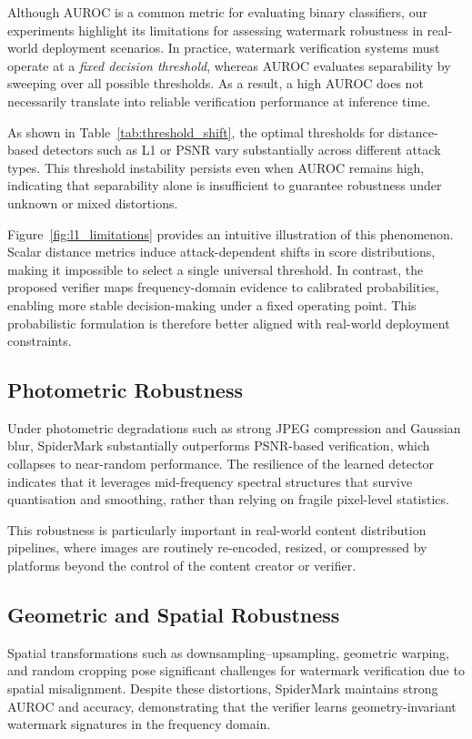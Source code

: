 \documentclass[lettersize,journal,review]{IEEEtran}
\begin{document}
Although AUROC is a common metric for evaluating binary classifiers, our experiments highlight its limitations for assessing watermark robustness in real-world deployment scenarios. In practice, watermark verification systems must operate at a \emph{fixed decision threshold}, whereas AUROC evaluates separability by sweeping over all possible thresholds. As a result, a high AUROC does not necessarily translate into reliable verification performance at inference time.

As shown in Table~\ref{tab:threshold_shift}, the optimal thresholds for distance-based detectors such as L1 or PSNR vary substantially across different attack types. This threshold instability persists even when AUROC remains high, indicating that separability alone is insufficient to guarantee robustness under unknown or mixed distortions.

Figure~\ref{fig:l1_limitations} provides an intuitive illustration of this phenomenon. Scalar distance metrics induce attack-dependent shifts in score distributions, making it impossible to select a single universal threshold. In contrast, the proposed verifier maps frequency-domain evidence to calibrated probabilities, enabling more stable decision-making under a fixed operating point. This probabilistic formulation is therefore better aligned with real-world deployment constraints.

\subsection{Photometric Robustness}

Under photometric degradations such as strong JPEG compression and Gaussian blur, SpiderMark substantially outperforms PSNR-based verification, which collapses to near-random performance. The resilience of the learned detector indicates that it leverages mid-frequency spectral structures that survive quantisation and smoothing, rather than relying on fragile pixel-level statistics.

This robustness is particularly important in real-world content distribution pipelines, where images are routinely re-encoded, resized, or compressed by platforms beyond the control of the content creator or verifier.

\subsection{Geometric and Spatial Robustness}

Spatial transformations such as downsampling–upsampling, geometric warping, and random cropping pose significant challenges for watermark verification due to spatial misalignment. Despite these distortions, SpiderMark maintains strong AUROC and accuracy, demonstrating that the verifier learns geometry-invariant watermark signatures in the frequency domain.
\end{document}
